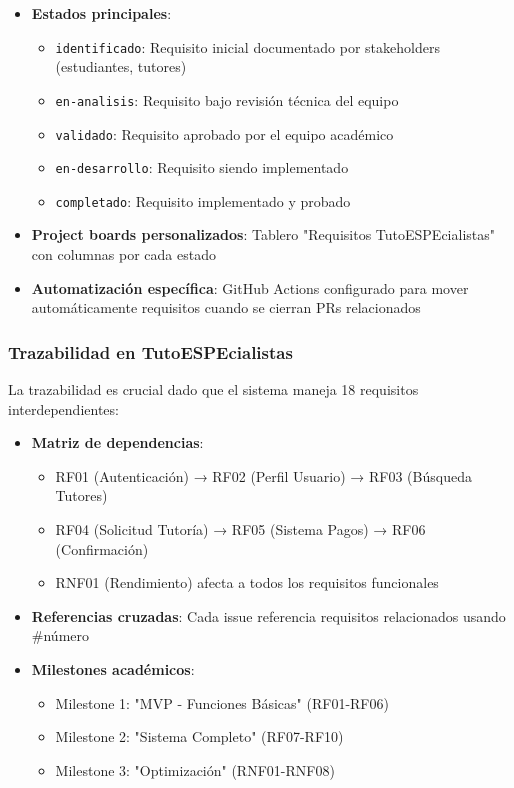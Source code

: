 \documentclass[12pt,a4paper]{article}
\begin{document}
\begin{itemize}
    \item \textbf{Estados principales}:
    \begin{itemize}
        \item \texttt{identificado}: Requisito inicial documentado por stakeholders (estudiantes, tutores)
        \item \texttt{en-analisis}: Requisito bajo revisión técnica del equipo
        \item \texttt{validado}: Requisito aprobado por el equipo académico
        \item \texttt{en-desarrollo}: Requisito siendo implementado
        \item \texttt{completado}: Requisito implementado y probado
    \end{itemize}
    \item \textbf{Project boards personalizados}: Tablero "Requisitos TutoESPEcialistas" con columnas por cada estado
    \item \textbf{Automatización específica}: GitHub Actions configurado para mover automáticamente requisitos cuando se cierran PRs relacionados
\end{itemize}

\subsubsection{Trazabilidad en TutoESPEcialistas}

La trazabilidad es crucial dado que el sistema maneja 18 requisitos interdependientes:

\begin{itemize}
    \item \textbf{Matriz de dependencias}:
    \begin{itemize}
        \item RF01 (Autenticación) → RF02 (Perfil Usuario) → RF03 (Búsqueda Tutores)
        \item RF04 (Solicitud Tutoría) → RF05 (Sistema Pagos) → RF06 (Confirmación)
        \item RNF01 (Rendimiento) afecta a todos los requisitos funcionales
    \end{itemize}
    \item \textbf{Referencias cruzadas}: Cada issue referencia requisitos relacionados usando \#número
    \item \textbf{Milestones académicos}:
    \begin{itemize}
        \item Milestone 1: "MVP - Funciones Básicas" (RF01-RF06)
        \item Milestone 2: "Sistema Completo" (RF07-RF10)
        \item Milestone 3: "Optimización" (RNF01-RNF08)
    \end{itemize}
\end{itemize}
\end{document}
